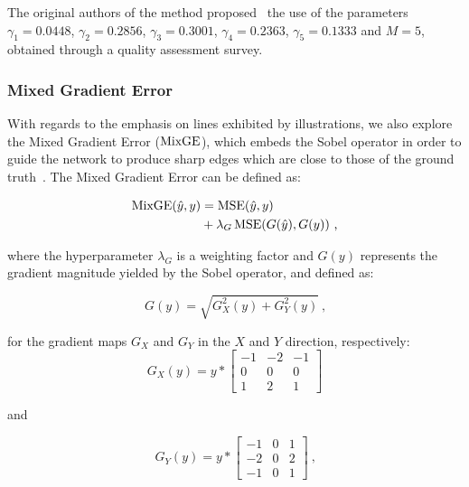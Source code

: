 The original authors of the method proposed~\cite{wang2004image} the use of the parameters $\gamma_1 = 0.0448$, $\gamma_2 = 0.2856$, $\gamma_3 = 0.3001$, $\gamma_4 = 0.2363$, $\gamma_5 = 0.1333$ and $M = 5$, obtained through a quality assessment survey.


\subsubsection{Mixed Gradient Error}

With regards to the emphasis on lines exhibited by illustrations, we also explore the Mixed Gradient Error ($\operatorname{MixGE}$), which embeds the Sobel operator in order to guide the network to produce sharp edges which are close to those of the ground truth~\cite{lu2019single}. The Mixed Gradient Error can be defined as:

\begin{equation}
  \begin{aligned}
    \operatorname{MixGE}(\hat{y}, y)
     & = \operatorname{MSE}(\hat{y}, y)                           \\
     & + \lambda_{G}\operatorname{MSE}(G(\hat{y}), G(y))~\text{,}
  \end{aligned}
\end{equation}

\noindent where the hyperparameter $\lambda_{G}$ is a weighting factor and $G(y)$ represents the gradient magnitude yielded by the Sobel operator,  and defined as:

\begin{equation}
  G(y) = \sqrt{G_{X}^{2}(y) + G_{Y}^{2}(y)}~\text{,}
\end{equation}

\noindent for the gradient maps ${G_{X}}$ and {$G_{Y}$} in the $X$ and $Y$ direction, respectively:
\begin{equation}
  G_{X}(y) = y \ast
  \begin{bmatrix}
    -1 & -2 & -1 \\
    0  & 0  & 0  \\
    1  & 2  & 1
  \end{bmatrix}
\end{equation}

\noindent and

\begin{equation}
  G_{Y}(y) = y \ast
  \begin{bmatrix}
    -1 & 0 & 1 \\
    -2 & 0 & 2 \\
    -1 & 0 & 1
  \end{bmatrix}~\text{,}
\end{equation}

